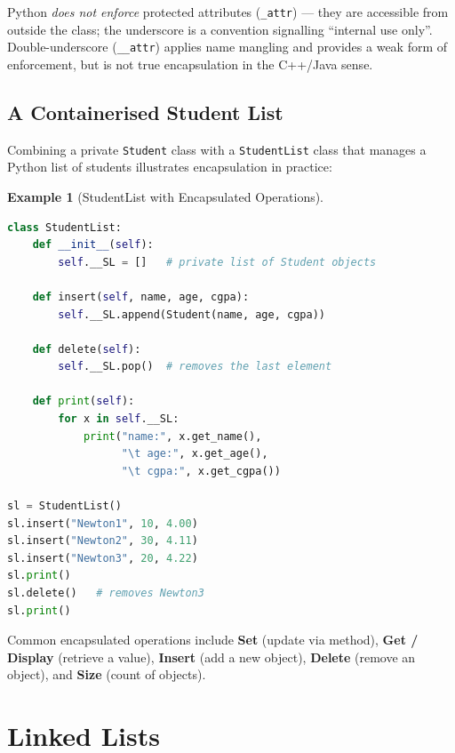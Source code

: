 \documentclass[11pt, a4paper, notitlepage]{report}
\theoremstyle{definition}
\theoremstyle{remark}
\theoremstyle{definition}
\newtheorem{example}[theorem]{Example}
\begin{document}
\begin{examtip}[title={Exam Tip: Private vs.\ Protected in Python}]
Python \emph{does not enforce} protected attributes (\texttt{\_attr}) ---
they are accessible from outside the class; the underscore is a convention
signalling ``internal use only''. Double-underscore (\texttt{\_\_attr}) applies
name mangling and provides a weak form of enforcement, but is not true
encapsulation in the C++/Java sense.
\end{examtip}

\subsection{A Containerised Student List}
\label{subsec:student-list}

Combining a private \texttt{Student} class with a \texttt{StudentList} class
that manages a Python list of students illustrates encapsulation in practice:

\begin{example}[StudentList with Encapsulated Operations]
\leavevmode
\begin{lstlisting}[language=Python]
class StudentList:
    def __init__(self):
        self.__SL = []   # private list of Student objects

    def insert(self, name, age, cgpa):
        self.__SL.append(Student(name, age, cgpa))

    def delete(self):
        self.__SL.pop()  # removes the last element

    def print(self):
        for x in self.__SL:
            print("name:", x.get_name(),
                  "\t age:", x.get_age(),
                  "\t cgpa:", x.get_cgpa())

sl = StudentList()
sl.insert("Newton1", 10, 4.00)
sl.insert("Newton2", 30, 4.11)
sl.insert("Newton3", 20, 4.22)
sl.print()
sl.delete()   # removes Newton3
sl.print()
\end{lstlisting}
\end{example}

Common encapsulated operations include \textbf{Set} (update via method),
\textbf{Get / Display} (retrieve a value), \textbf{Insert} (add a new object),
\textbf{Delete} (remove an object), and \textbf{Size} (count of objects).

\section{Linked Lists}
\label{sec:linked-lists}
\end{document}
